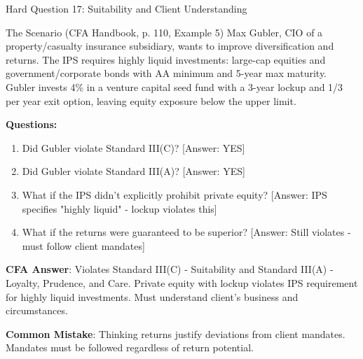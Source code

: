 \documentclass{beamer}
\begin{document}
	\begin{frame}{Hard Question 17: Suitability and Client Understanding}
		\begin{block}{The Scenario (CFA Handbook, p. 110, Example 5)}
			Max Gubler, CIO of a property/casualty insurance subsidiary, wants to improve diversification and returns. The IPS requires highly liquid investments: large-cap equities and government/corporate bonds with AA minimum and 5-year max maturity. Gubler invests 4\% in a venture capital seed fund with a 3-year lockup and 1/3 per year exit option, leaving equity exposure below the upper limit.
		\end{block}
		
		\vspace{0.2cm}
		\textbf{Questions:}
		\begin{enumerate}
			\item Did Gubler violate Standard III(C)? \textcolor{cfared}{[Answer: YES]}
			\item Did Gubler violate Standard III(A)? \textcolor{cfared}{[Answer: YES]}
			\item What if the IPS didn't explicitly prohibit private equity? \textcolor{cfared}{[Answer: IPS specifies "highly liquid" - lockup violates this]}
			\item What if the returns were guaranteed to be superior? \textcolor{cfared}{[Answer: Still violates - must follow client mandates]}
		\end{enumerate}
		
		\vspace{0.2cm}
		\textcolor{cfablue}{\textbf{CFA Answer}}: Violates Standard III(C) - Suitability and Standard III(A) - Loyalty, Prudence, and Care. Private equity with lockup violates IPS requirement for highly liquid investments. Must understand client's business and circumstances.
		
		\vspace{0.1cm}
		\textcolor{cfared}{\textbf{Common Mistake}}: Thinking returns justify deviations from client mandates. Mandates must be followed regardless of return potential.
	\end{frame}
	
\end{document}
